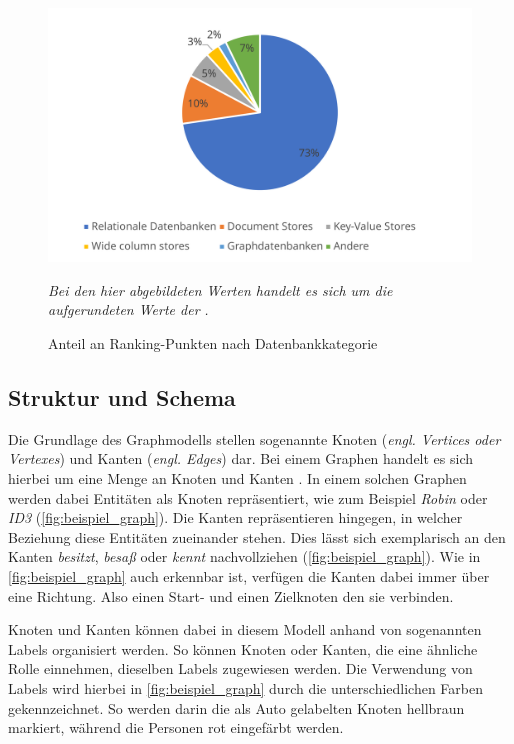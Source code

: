 \begin{figure}[ht]
    \centering
    \includegraphics[width=\textwidth]{images/dbms_marketshare.pdf}
    \caption[Anteil Ranking-Punkte nach Datenbankkategorie]{Anteil an Ranking-Punkten nach Datenbankkategorie}
    \label{fig:dbms_marketshare}
    \vspace{1em}
    \textit{Bei den hier abgebildeten Werten handelt es sich um die aufgerundeten Werte der} \textit{.}
\end{figure}

\subsection{Struktur und Schema}
\label{datenmodelle:structure}
Die Grundlage des Graphmodells stellen sogenannte Knoten (\textit{engl. Vertices oder Vertexes}) und Kanten (\textit{engl. Edges}) dar. Bei einem Graphen handelt es sich hierbei um eine Menge an Knoten und Kanten \cite{gdbms}. In einem solchen Graphen werden dabei Entitäten als Knoten repräsentiert, wie zum Beispiel \textit{Robin} oder \textit{ID3} (\autoref{fig:beispiel_graph}). Die Kanten repräsentieren hingegen, in welcher Beziehung diese Entitäten zueinander stehen. Dies lässt sich exemplarisch an den Kanten \textit{besitzt}, \textit{besaß} oder \textit{kennt} nachvollziehen (\autoref{fig:beispiel_graph}). Wie in \autoref{fig:beispiel_graph} auch erkennbar ist, verfügen die Kanten dabei immer über eine Richtung. Also einen Start- und einen Zielknoten den sie verbinden. 

Knoten und Kanten können dabei in diesem Modell anhand von sogenannten Labels organisiert werden. So können Knoten oder Kanten, die eine ähnliche Rolle einnehmen, dieselben Labels zugewiesen werden. Die Verwendung von Labels wird hierbei in \autoref{fig:beispiel_graph} durch die unterschiedlichen Farben gekennzeichnet. So werden darin die als Auto gelabelten Knoten hellbraun markiert, während die Personen rot eingefärbt werden. 

